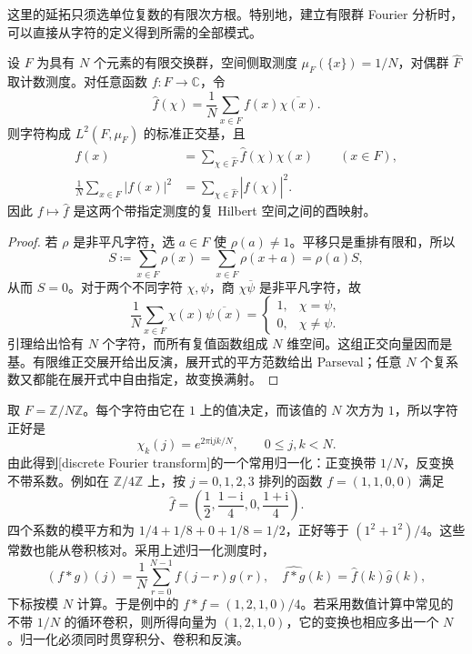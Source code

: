 这里的延拓只须选单位复数的有限次方根。特别地，建立有限群 Fourier 分析时，可以直接从字符的定义得到所需的全部模式。

\begin{theorem}\label{b2:thm:I4-finite-fourier}
设 \(F\) 为具有 \(N\) 个元素的有限交换群，空间侧取测度 \(\mu_F(\{x\})=1/N\)，对偶群 \(\widehat F\) 取计数测度。对任意函数 \(f:F\rightarrow\mathbb C\)，令
\[
 \widehat f(\chi)=\frac1N\sum_{x\in F}f(x)\overline{\chi(x)}.
\]
则字符构成 \(L^2(F,\mu_F)\) 的标准正交基，且
\begin{align*}
 f(x)&=\sum_{\chi\in\widehat F}\widehat f(\chi)\chi(x)
       \qquad(x\in F),\\
 \frac1N\sum_{x\in F}|f(x)|^2
      &=\sum_{\chi\in\widehat F}|\widehat f(\chi)|^2.
\end{align*}
因此 \(f\mapsto\widehat f\) 是这两个带指定测度的复 Hilbert 空间之间的酉映射。
\end{theorem}
\begin{proof}
若 \(\rho\) 是非平凡字符，选 \(a\in F\) 使 \(\rho(a)\ne1\)。平移只是重排有限和，所以
\[
 S\coloneqq\sum_{x\in F}\rho(x)
 =\sum_{x\in F}\rho(x+a)=\rho(a)S,
\]
从而 \(S=0\)。对于两个不同字符 \(\chi,\psi\)，商 \(\chi\overline\psi\) 是非平凡字符，故
\[
 \frac1N\sum_{x\in F}\chi(x)\overline{\psi(x)}
 =\begin{cases}1,&\chi=\psi,\\0,&\chi\ne\psi.\end{cases}
\]
引理给出恰有 \(N\) 个字符，而所有复值函数组成 \(N\) 维空间。这组正交向量因而是基。有限维正交展开给出反演，展开式的平方范数给出 Parseval；任意 \(N\) 个复系数又都能在展开式中自由指定，故变换满射。
\end{proof}

取 \(F=\mathbb Z/N\mathbb Z\)。每个字符由它在 \(1\) 上的值决定，而该值的 \(N\) 次方为 \(1\)，所以字符正好是
\[
 \chi_k(j)=e^{2\pi\mathrm i jk/N},\qquad 0\le j,k<N.
\]
由此得到[discrete Fourier transform]的一个常用归一化：正变换带 \(1/N\)，反变换不带系数。例如在 \(\mathbb Z/4\mathbb Z\) 上，按 \(j=0,1,2,3\) 排列的函数 \(f=(1,1,0,0)\) 满足
\[
 \widehat f=\left(\frac12,\frac{1-\mathrm i}{4},0,
                         \frac{1+\mathrm i}{4}\right).
\]
四个系数的模平方和为 \(1/4+1/8+0+1/8=1/2\)，正好等于 \((1^2+1^2)/4\)。这些常数也能从卷积核对。采用上述归一化测度时，
\[
 (f*g)(j)=\frac1N\sum_{r=0}^{N-1}f(j-r)g(r),
 \quad \widehat{f*g}(k)=\widehat f(k)\widehat g(k),
\]
下标按模 \(N\) 计算。于是例中的 \(f*f=(1,2,1,0)/4\)。若采用数值计算中常见的不带 \(1/N\) 的循环卷积，则所得向量为 \((1,2,1,0)\)，它的变换也相应多出一个 \(N\)。归一化必须同时贯穿积分、卷积和反演。

